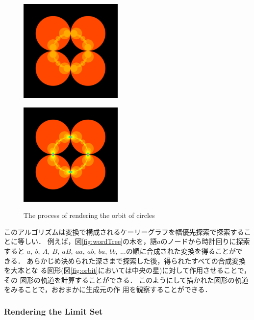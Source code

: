 \begin{figure}[htbp]
\begin{minipage}{0.33\hsize}
  \subcaption{}
  \label{fig:level1inv}
 \end{minipage}
 \begin{minipage}{0.33\hsize}
  \center
  \includegraphics[width=2in, height=2in, keepaspectratio]{../img/klein/orbit/level2.pdf}
  \subcaption{}
  \label{fig:level2}
 \end{minipage}
 \begin{minipage}{0.33\hsize}
  \center
  \includegraphics[width=2in, height=2in, keepaspectratio]{../img/klein/orbit/levelMax.pdf}
  \subcaption{}
  \label{fig:levelMax}
 \end{minipage}
 \caption{The process of rendering the orbit of circles}
\end{figure}

このアルゴリズムは変換で構成されるケーリーグラフを幅優先探索で探索するこ
とに等しい．
例えば，図\ref{fig:wordTree}の木を，語$a$のノードから時計回りに探索すると
$a,~b,~A,~B,~aB,~aa,~ab,~ba,~bb,~...$の順に合成された変換を得ることがで
きる．
あらかじめ決められた深さまで探索した後，得られたすべての合成変換を大本とな
る図形(図\ref{fig:orbit}においては中央の星)に対して作用させることで，その
図形の軌道を計算することができる．
このようにして描かれた図形の軌道をみることで，おおまかに生成元の作
用を観察することができる．

\subsubsection{Rendering the Limit Set}

